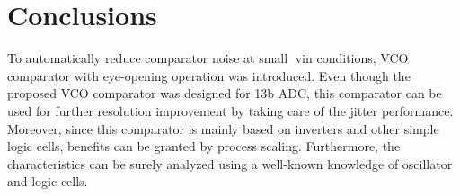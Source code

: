 \documentclass[letterpaper, 10 pt, conference]{ieeeconf}  %
\begin{document}
\section{Conclusions}
To automatically reduce comparator noise at small vin conditions, VCO comparator with eye-opening operation was introduced.  Even though the proposed VCO comparator was designed for 13b ADC, this comparator can be used for further resolution improvement by taking care of the jitter performance. Moreover, since this comparator is mainly based on inverters and other simple logic cells, benefits can be granted by process scaling. Furthermore, the characteristics can be surely analyzed using a well-known knowledge of oscillator and logic cells. 




\end{document}
